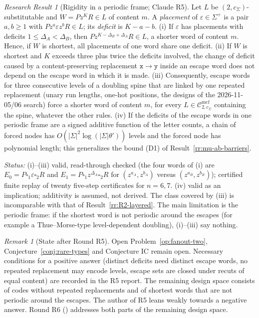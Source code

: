 \documentclass[11pt]{article}
\numberwithin{equation}{section}
\theoremstyle{plain}
\theoremstyle{definition}
\theoremstyle{remark}
\newtheorem{remark}[theorem]{Remark}
\newtheorem{rresult}[theorem]{Research Result}
\newcommand{\Cmcf}[2]{\mathcal{C}^{\mathrm{mcf}}_{#1,#2}}
\newcommand{\blank}{\square}
\theoremstyle{plain}
\begin{document}
\begin{rresult}[Rigidity in a periodic frame; Claude R5]
\label{rr:R5-rigidity}
Let $L$ be $(2,c_\Sigma)$-substitutable and $W=Pz^KR\in L$ of content $m$.  A
\emph{placement} of $\varepsilon\in\Sigma^+$ is a pair $a,b\ge1$ with
$Pz^a\varepsilon z^bR\in L$; its \emph{deficit} is $K-a-b$.
(i) If $\varepsilon$ has placements with deficits $1\le\Delta_A<\Delta_B$, then
$Pz^{K-\Delta_B+\Delta_A}R\in L$, a shorter word of content $m$.  Hence, if $W$ is
shortest, all placements of one word share one deficit.
(ii) If $W$ is shortest and $K$ exceeds three plus twice the deficits involved, the change of
deficit caused by a content-preserving replacement $\mathtt x\to\mathtt y$ inside an escape
word does not depend on the escape word in which it is made.
(iii) Consequently, escape words for three consecutive levels of a doubling spine that are
linked by one repeated replacement (unary run lengths, one-hot positions, the designs of
the 2026-11-05/06 search) force a shorter word of content $m$, for every
$L\in\Cmcf{2}{c_\Sigma}$ containing the spine, whatever the other rules.
(iv) If the deficits of the escape words in one periodic frame are a signed additive
function of the letter counts, a chain of forced nodes has $O(|\Sigma|^2\log(|\Sigma|\theta'))$
levels and the forced node has polynomial length; this generalizes the bound (D1) of
Result~\ref{rr:mu-ab-barriers}.
\end{rresult}
\noindent\emph{Status:} (i)--(iii) valid, read-through checked (the four words of
(i) are $E_0=P\blank_1\varepsilon\blank_2R$ and $E_1=P\blank_1z^{\Delta_A}\blank_2R$ for
$(z^{a_A},z^{b_A})$ versus $(z^{a_B},z^{b_B})$); certified finite replay of twenty
five-step certificates for $n=6,7$.  (iv) valid as an implication; additivity is assumed,
not derived.  The class covered by (iii) is incomparable with that of
Result~\ref{rr:R2-layered}.  The main limitation is the periodic frame: if the shortest
word is not periodic around the escapes (for example a Thue--Morse-type level-dependent
doubling), (i)--(iii) say nothing.

\begin{remark}[State after Round R5]
\label{rem:R5-state}
Open Problem~\ref{op:fanout-two}, Conjecture~\ref{conj:rare-types} and Conjecture IC remain
open.  Necessary conditions for a positive answer (distinct deficits need distinct escape
words, no repeated replacement may encode levels, escape sets are closed under recuts of
equal content) are recorded in the R5 report.  The remaining design space consists of codes
without repeated replacements and of shortest words that are not periodic around the
escapes.  The author of R5 leans weakly towards a negative answer.  Round R6
() addresses both parts of the
remaining design space.
\end{remark}
\end{document}
